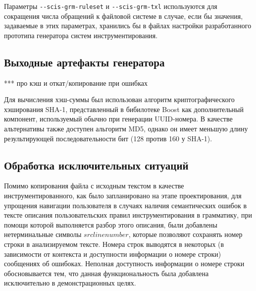 Параметры \lstinline{--scis-grm-ruleset} и \lstinline{--scis-grm-txl} используются для сокращения числа обращений к файловой системе в случае, если бы значения, задаваемые в этих параметрах, хранились бы в файлах настройки разработанного прототипа генератора систем инструментирования.

\subsection{Выходные артефакты генератора}

***
про кэш и откат/копирование при ошибках

Для вычисления хэш-суммы был использован алгоритм криптографического хэширования SHA-1, представленный в бибилотеке Boost как дополнительный компонент, используемый обычно при генерации UUID-номера.
В качестве альтернативы также доступен альгоритм MD5, однако он имеет меньшую длину результирующей последовательности бит (128 против 160 у SHA-1).


\subsection{Обработка исключительных ситуаций}

Помимо копирования файла с исходным текстом в качестве инструментированного, как было запланировано на этапе проектирования, для упрощения навигации пользователя в случаях наличия семантических ошибок в тексте описания пользовательских правил инструментирования в грамматику, при помощи которой выполняется разбор этого описания, были добавлены нетерминальные символы $srclinenumber$, которые позволяют сохранять номер строки в анализируемом тексте.
Номера строк выводятся в некоторых (в зависимости от контекста и доступности информации о номере строки) сообщениях об ошибоках.
Неполная доступность информации о номере строки обосновывается тем, что данная функциональность была добавлена исключительно в демонстрационных целях.

